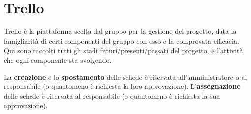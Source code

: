 \chapter{Trello}

Trello è la piattaforma scelta dal gruppo per la gestione del progetto, data la famigliarit\`{a} di certi componenti del gruppo con esso e la comprovata efficacia.
Qui sono raccolti tutti gli stadi futuri/presenti/passati del progetto, e l'attivit\`{a} che ogni componente sta svolgendo.

La \textbf{creazione} e lo \textbf{spostamento} delle schede è riservata all'amministratore o al responsabile (o quantomeno è richiesta la loro approvazione).
L'\textbf{assegnazione} delle schede è riservata al responsabile (o quantomeno è richiesta la sua approvazione).
